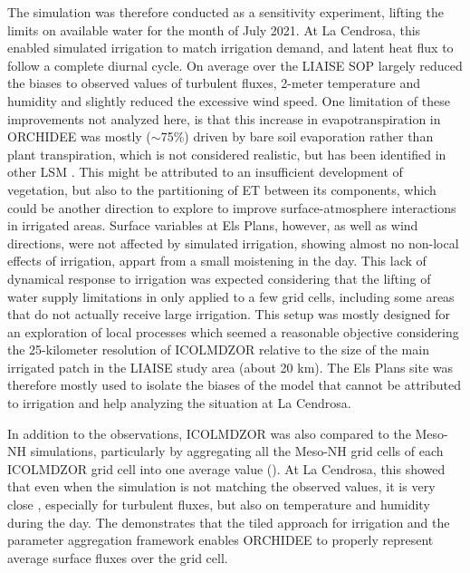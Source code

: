 The \irrboost simulation was therefore conducted as a sensitivity experiment, lifting the limits on available water for the month of July 2021.
At La Cendrosa, this enabled simulated irrigation to match irrigation demand, and latent heat flux to follow a complete diurnal cycle. On average over the LIAISE SOP \irrboost largely reduced the biases to observed values of turbulent fluxes, 2-meter temperature and humidity and slightly reduced the excessive wind speed. 
One limitation of these improvements not analyzed here, is that this increase in evapotranspiration in ORCHIDEE was mostly ($\sim$75\%) driven by bare soil evaporation rather than plant transpiration, which is not considered realistic, but has been identified in other LSM \citep{marti_implementation_2025}. %
This might be attributed to an insufficient development of vegetation, but also to the partitioning of ET between its components, which could be another direction to explore to improve surface-atmosphere interactions in irrigated areas.
Surface variables at Els Plans, however, as well as wind directions, were not affected by simulated irrigation, showing almost no non-local effects of irrigation, appart from a small moistening in the day.
This lack of dynamical response to irrigation was expected considering that the lifting of water supply limitations in \irrboost only applied to a few grid cells, including some areas that do not actually receive large irrigation. This setup was mostly designed for an exploration of local processes which seemed a reasonable objective considering the 25-kilometer resolution of ICOLMDZOR relative to the size of the main irrigated patch in the LIAISE study area (about 20 km). The Els Plans site was therefore mostly used to isolate the biases of the model that cannot be attributed to irrigation and help analyzing the situation at La Cendrosa.

In addition to the observations, ICOLMDZOR was also compared to the Meso-NH simulations, particularly by aggregating all the Meso-NH grid cells of each ICOLMDZOR grid cell into one average value (\mesomean). At La Cendrosa, this showed that even when the \irrboost simulation is not matching the observed values, it is very close \mesomean, especially for turbulent fluxes, but also on temperature and humidity during the day. 
The demonstrates that the tiled approach for irrigation and the parameter aggregation framework enables ORCHIDEE to properly represent average surface fluxes over the grid cell.

